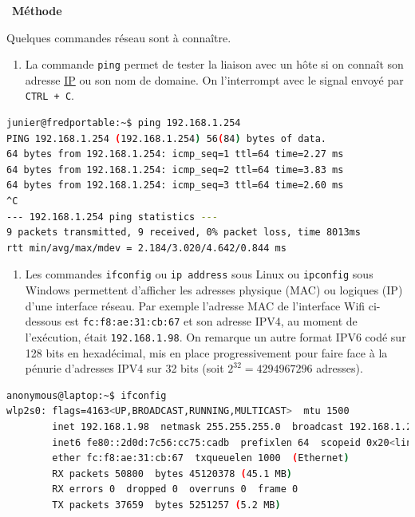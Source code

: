 \documentclass[
  11pt,
]{article}
\newcommand{\passthrough}[1]{#1}
\providecommand{\tightlist}{%
  \setlength{\itemsep}{0pt}\setlength{\parskip}{0pt}}
\newcounter{rque}
\newcounter{def}
\newcounter{prog}
\newcounter{logi}
\newenvironment{methode}[1]
{\par \medskip    \noindent  
 \begin {bclogo}[arrondi =0.1,logo=\bcoutil, marge=4,noborder = true] {~\textbf{Méthode}   {\itshape #1} }  \par}
{
\end{bclogo}
 \par \bigskip }
\begin{document}
\begin{methode}{}

Quelques commandes réseau sont à connaître.

\begin{enumerate}
\def\labelenumi{\arabic{enumi}.}
\tightlist
\item
  La commande \passthrough{\lstinline!ping!} permet de tester la liaison
  avec un hôte si on connaît son adresse
  \href{https://fr.wikipedia.org/wiki/Internet_Protocol}{IP} ou son nom
  de domaine. On l'interrompt avec le signal envoyé par
  \passthrough{\lstinline!CTRL + C!}.
\end{enumerate}

\begin{lstlisting}[language=bash]
junier@fredportable:~$ ping 192.168.1.254
PING 192.168.1.254 (192.168.1.254) 56(84) bytes of data.
64 bytes from 192.168.1.254: icmp_seq=1 ttl=64 time=2.27 ms
64 bytes from 192.168.1.254: icmp_seq=2 ttl=64 time=3.83 ms
64 bytes from 192.168.1.254: icmp_seq=3 ttl=64 time=2.60 ms
^C
--- 192.168.1.254 ping statistics ---
9 packets transmitted, 9 received, 0% packet loss, time 8013ms
rtt min/avg/max/mdev = 2.184/3.020/4.642/0.844 ms
\end{lstlisting}

\begin{enumerate}
\def\labelenumi{\arabic{enumi}.}
\setcounter{enumi}{1}
\tightlist
\item
  Les commandes \passthrough{\lstinline!ifconfig!} ou
  \passthrough{\lstinline!ip address!} sous Linux ou
  \passthrough{\lstinline!ipconfig!} sous Windows permettent d'afficher
  les adresses physique (MAC) ou logiques (IP) d'une interface réseau.
  Par exemple l'adresse MAC de l'interface Wifi ci-dessous est
  \passthrough{\lstinline!fc:f8:ae:31:cb:67!} et son adresse IPV4, au
  moment de l'exécution, était \passthrough{\lstinline!192.168.1.98!}.
  On remarque un autre format IPV6 codé sur 128 bits en hexadécimal, mis
  en place progressivement pour faire face à la pénurie d'adresses IPV4
  sur 32 bits (soit \(2^{32}=4294967296\) adresses).
\end{enumerate}

\begin{lstlisting}[language=bash]
anonymous@laptop:~$ ifconfig
wlp2s0: flags=4163<UP,BROADCAST,RUNNING,MULTICAST>  mtu 1500
        inet 192.168.1.98  netmask 255.255.255.0  broadcast 192.168.1.255
        inet6 fe80::2d0d:7c56:cc75:cadb  prefixlen 64  scopeid 0x20<link>
        ether fc:f8:ae:31:cb:67  txqueuelen 1000  (Ethernet)
        RX packets 50800  bytes 45120378 (45.1 MB)
        RX errors 0  dropped 0  overruns 0  frame 0
        TX packets 37659  bytes 5251257 (5.2 MB)
\end{lstlisting}


\end{methode}
\end{document}
